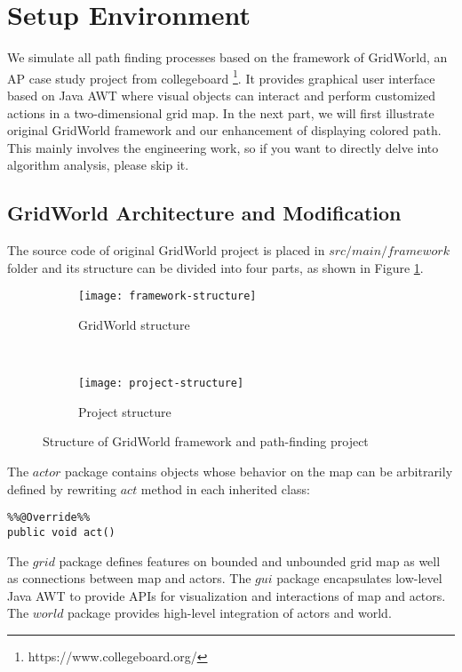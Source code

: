 \section{Setup Environment}

We simulate all path finding processes based on the framework of 
GridWorld\cite{web:gridworld}, an AP case study project from collegeboard
\footnote{https://www.collegeboard.org/}. It provides graphical user interface 
based on Java AWT where visual objects can interact and perform customized 
actions in a two-dimensional grid map. In the next part, we will first illustrate
original GridWorld framework and our enhancement of displaying colored path.
This mainly involves the engineering work, so if you want to directly delve 
into algorithm analysis, please skip it.

\subsection{GridWorld Architecture and Modification}

The source code of original GridWorld project is placed in $src/main/framework$
folder and its structure can be divided into four parts, as shown in Figure 
\ref{fig:framework-structure}.

\begin{figure}[ht]
  \centering
  \begin{subfigure}[b]{0.45\textwidth}
    \texttt{[image: framework-structure]}
    \caption{GridWorld structure}
    \label{fig:framework-structure}
  \end{subfigure}
  ~
  \begin{subfigure}[b]{0.45\textwidth}
    \texttt{[image: project-structure]}
    \caption{Project structure}
    \label{fig:project-structure}
  \end{subfigure}
\caption{Structure of GridWorld framework and path-finding project}
\end{figure}

The $actor$ package contains objects whose behavior on the map can be arbitrarily 
defined by rewriting $act$ method in each inherited class:

\begin{lstlisting}
%%@Override%%
public void act()
\end{lstlisting}

The $grid$ package defines features on bounded and unbounded grid map as well 
as connections between map and actors. The $gui$ package encapsulates low-level
Java AWT to provide APIs for visualization and interactions of map and actors.
The $world$ package provides high-level integration of actors and world.

